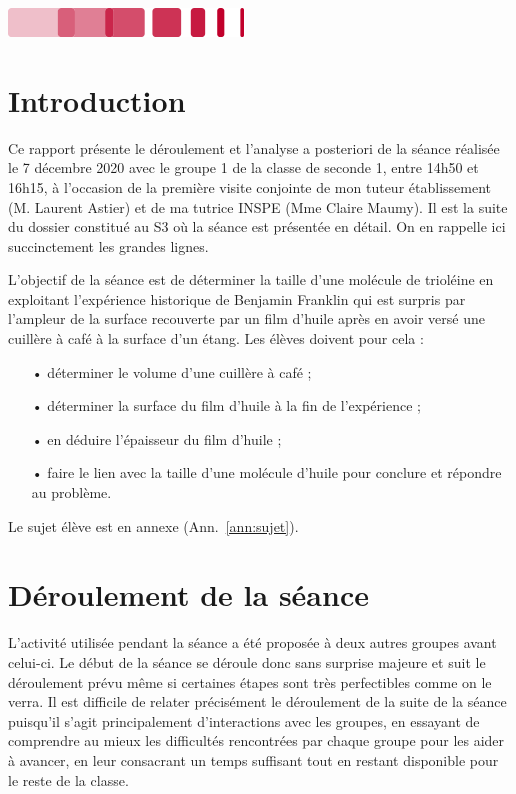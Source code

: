 \documentclass[12pt,a4paper, fleqn]{article}
\begin{document}
\vfill

\hfill
\includegraphics[scale=1]{logo_bottom.png}

\thispagestyle{empty}

\newpage

\tableofcontents
\newpage

\section*{Introduction}

Ce rapport présente le déroulement et l'analyse a posteriori de la séance réalisée le 7 décembre 2020 avec le groupe 1 de la classe de seconde 1, entre 14h50 et 16h15, à l'occasion de la première visite conjointe de mon tuteur établissement (M. Laurent Astier) et de ma tutrice INSPE (Mme Claire Maumy).
Il est la suite du dossier constitué au S3 où la séance est présentée en détail.
On en rappelle ici succinctement les grandes lignes.

L'objectif de la séance est de déterminer la taille d'une molécule de trioléine en exploitant l'expérience historique de Benjamin Franklin qui est surpris par l'ampleur de la surface recouverte par un film d'huile après en avoir versé une cuillère à café à la surface d'un étang.
Les élèves doivent pour cela :
\begin{itemize}
\item[•] déterminer le volume d'une cuillère à café ;
\item[•] déterminer la surface du film d'huile à la fin de l'expérience ;
\item[•] en déduire l'épaisseur du film d'huile ;
\item[•] faire le lien avec la taille d'une molécule d'huile pour conclure et répondre au problème.
\end{itemize}
Le sujet élève est en annexe (Ann.~\ref{ann:sujet}).

\section{Déroulement de la séance}

L'activité utilisée pendant la séance a été proposée à deux autres groupes avant celui-ci.
Le début de la séance se déroule donc sans surprise majeure et suit le déroulement prévu même si certaines étapes sont très perfectibles comme on le verra.
Il est difficile de relater précisément le déroulement de la suite de la séance puisqu'il s'agit principalement  d'interactions avec les groupes, en essayant de comprendre au mieux les difficultés rencontrées par chaque groupe pour les aider à avancer, en leur consacrant un temps suffisant tout en restant disponible pour le reste de la classe.
\end{document}
